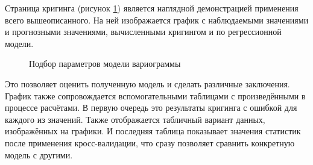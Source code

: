Страница кригинга (рисунок \ref{img:mod_krige}) является наглядной демонстрацией применения всего вышеописанного. На ней изображается график с наблюдаемыми значениями и прогнозными значениями, вычисленными кригингом и по регрессионной модели.
\begin{figure}[ht]
\caption{Подбор параметров модели вариограммы}
\label{img:mod_krige}
\end{figure}
Это позволяет оценить полученную модель и сделать различные заключения. График также сопровождается вспомогательными таблицами с произведёнными в процессе расчётами. В первую очередь это результаты кригинга с ошибкой для каждого из значений. Также отображается табличный вариант данных, изображённых на графики. И последняя таблица показывает значения статистик после применения кросс-валидации, что сразу позволяет сравнить конкретную модель с другими.

